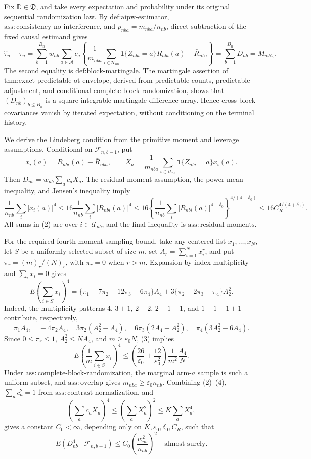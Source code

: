 Fix \(\mathbb D\in\mathfrak D\), and take every expectation and probability under its original sequential randomization law. By \(\text{def:aipw-estimator}\), \(\mathrm{ass:consistency\text{-}no\text{-}interference}\), and \(p_{nba}=m_{nba}/n_{nb}\), direct subtraction of the fixed causal estimand gives
\[
\widehat\tau_n-\tau_n
=\sum_{b=1}^{B_n}w_{nb}\sum_{a\in\mathcal A}c_a
\left\{\frac1{m_{nba}}\sum_{i\in\mathcal U_{nb}}
\mathbf 1\{Z_{nbi}=a\}R_{nbi}(a)-\bar R_{nba}\right\}
=\sum_{b=1}^{B_n}D_{nb}=M_{nB_n}. \tag{1}
\]
The second equality is \(\text{def:block-martingale}\). The martingale assertion of \(\text{thm:exact-predictable-ot-envelope}\), derived from predictable counts, predictable adjustment, and conditional complete-block randomization, shows that \((D_{nb})_{b\le B_n}\) is a square-integrable martingale-difference array. Hence cross-block covariances vanish by iterated expectation, without conditioning on the terminal history.

We derive the Lindeberg condition from the primitive moment and leverage assumptions. Conditional on \(\mathcal F_{n,b-1}\), put
\[
x_i(a)=R_{nbi}(a)-\bar R_{nba},\qquad
X_a=\frac1{m_{nba}}\sum_{i\in\mathcal U_{nb}}
\mathbf 1\{Z_{nbi}=a\}x_i(a).
\]
Then \(D_{nb}=w_{nb}\sum_a c_aX_a\). The residual-moment assumption, the power-mean inequality, and Jensen's inequality imply
\[
\frac1{n_{nb}}\sum_i|x_i(a)|^4
\le16\frac1{n_{nb}}\sum_i|R_{nbi}(a)|^4
\le16\left\{\frac1{n_{nb}}\sum_i|R_{nbi}(a)|^{4+\delta_0}\right\}^{4/(4+\delta_0)}
\le16C_R^{4/(4+\delta_0)}. \tag{2}
\]
All sums in (2) are over \(i\in\mathcal U_{nb}\), and the final inequality is \(\mathrm{ass:residual\text{-}moments}\).

For the required fourth-moment sampling bound, take any centered list \(x_1,\ldots,x_N\), let \(S\) be a uniformly selected subset of size \(m\), set \(A_r=\sum_{i=1}^N x_i^r\), and put \(\pi_r=(m)_r/(N)_r\), with \(\pi_r=0\) when \(r>m\). Expansion by index multiplicity and \(\sum_i x_i=0\) gives
\[
E\left(\sum_{i\in S}x_i\right)^4
=\{\pi_1-7\pi_2+12\pi_3-6\pi_4\}A_4
+3\{\pi_2-2\pi_3+\pi_4\}A_2^2. \tag{3}
\]
Indeed, the multiplicity patterns \(4\), \(3+1\), \(2+2\), \(2+1+1\), and \(1+1+1+1\) contribute, respectively,
\[
\pi_1A_4,\quad -4\pi_2A_4,\quad
3\pi_2(A_2^2-A_4),\quad
6\pi_3(2A_4-A_2^2),\quad
\pi_4(3A_2^2-6A_4).
\]
Since \(0\le\pi_r\le1\), \(A_2^2\le NA_4\), and \(m\ge\varepsilon_0N\), (3) implies
\[
E\left(\frac1m\sum_{i\in S}x_i\right)^4
\le \left(\frac{26}{\varepsilon_0}+\frac{12}{\varepsilon_0^2}\right)
\frac1{m^2}\frac{A_4}{N}. \tag{4}
\]
Under \(\mathrm{ass:complete\text{-}block\text{-}randomization}\), the marginal arm-\(a\) sample is such a uniform subset, and \(\mathrm{ass:overlap}\) gives \(m_{nba}\ge\varepsilon_0n_{nb}\). Combining (2)--(4), \(\sum_ac_a^2=1\) from \(\mathrm{ass:contrast\text{-}normalization}\), and
\[
\left(\sum_ac_aX_a\right)^4
\le\left(\sum_aX_a^2\right)^2
\le K\sum_aX_a^4,
\]
gives a constant \(C_0<\infty\), depending only on \(K,\varepsilon_0,\delta_0,C_R\), such that
\[
E(D_{nb}^4\mid\mathcal F_{n,b-1})
\le C_0\left(\frac{w_{nb}^2}{n_{nb}}\right)^2
\quad\text{almost surely.} \tag{5}
\]

